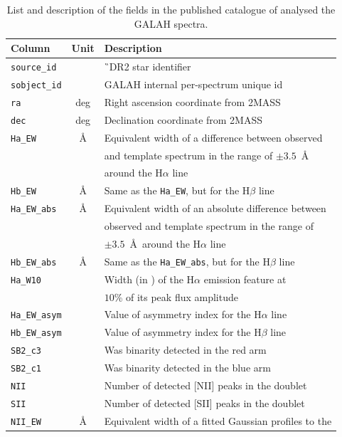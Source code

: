 \begin{table}
	\centering
	\caption{List and description of the fields in the published catalogue of analysed the GALAH spectra.}
	\label{tab:results}
	\begin{tabular}{l c l}
		\hline
		Column & Unit & Description \\
		\hline
		\texttt{source\_id} & & \G\ DR2 star identifier \\
		\texttt{sobject\_id} & & GALAH internal per-spectrum unique id \\
		\texttt{ra} & deg & Right ascension coordinate from 2MASS\\
		\texttt{dec} & deg & Declination coordinate from 2MASS\\
		\texttt{Ha\_EW} & \AA & Equivalent width of a difference between observed \\
		& & and template spectrum in the range of $\pm3.5$~\AA\ \\
		& & around the H$\alpha$ line \\
		\texttt{Hb\_EW} & \AA & Same as the \texttt{Ha\_EW}, but for the H$\beta$ line \\
		\texttt{Ha\_EW\_abs} & \AA & Equivalent width of an absolute difference between \\
		& & observed and template spectrum in the range of \\
		& & $\pm3.5$~\AA\ around the H$\alpha$ line \\
		\texttt{Hb\_EW\_abs} & \AA & Same as the \texttt{Ha\_EW\_abs}, but for the H$\beta$ line\\
		\texttt{Ha\_W10} & \kms & Width (in \kms) of the H$\alpha$ emission feature at \\
		& & $10$\% of its peak flux amplitude \\
		\texttt{Ha\_EW\_asym} & & Value of asymmetry index for the H$\alpha$ line \\
		\texttt{Hb\_EW\_asym} & & Value of asymmetry index for the H$\beta$ line \\
		\texttt{SB2\_c3} & & Was binarity detected in the red arm \\
		\texttt{SB2\_c1} & & Was binarity detected in the blue arm \\
		\texttt{NII} & & Number of detected [NII] peaks in the doublet \\
		\texttt{SII} & & Number of detected [SII] peaks in the doublet \\
		\texttt{NII\_EW} & \AA & Equivalent width of a fitted Gaussian profiles to the \\

\end{tabular}
\end{table}

